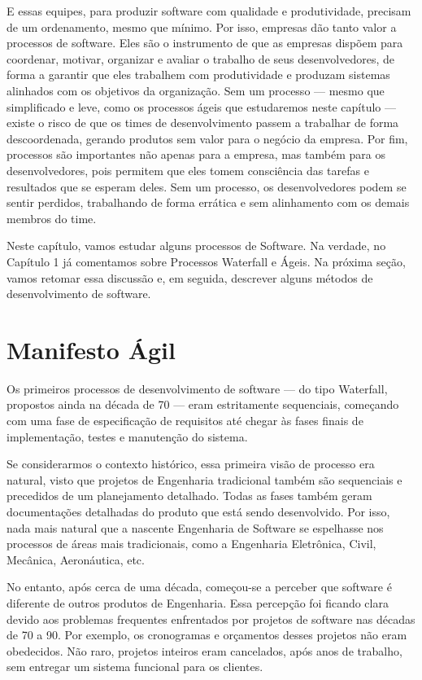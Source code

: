 \documentclass[
  11pt,
  twoside]{book}
\begin{document}
E essas equipes, para produzir software com qualidade e produtividade,
precisam de um ordenamento, mesmo que mínimo. Por isso, empresas dão
tanto valor a processos de software. Eles são o instrumento de que as
empresas dispõem para coordenar, motivar, organizar e avaliar o trabalho
de seus desenvolvedores, de forma a garantir que eles trabalhem com
produtividade e produzam sistemas alinhados com os objetivos da
organização. Sem um processo --- mesmo que simplificado e leve, como os
processos ágeis que estudaremos neste capítulo --- existe o risco de que
os times de desenvolvimento passem a trabalhar de forma descoordenada,
gerando produtos sem valor para o negócio da empresa. Por fim, processos
são importantes não apenas para a empresa, mas também para os
desenvolvedores, pois permitem que eles tomem consciência das tarefas e
resultados que se esperam deles. Sem um processo, os desenvolvedores
podem se sentir perdidos, trabalhando de forma errática e sem
alinhamento com os demais membros do time.

Neste capítulo, vamos estudar alguns processos de Software. Na verdade,
no Capítulo 1 já comentamos sobre Processos Waterfall e Ágeis. Na
próxima seção, vamos retomar essa discussão e, em seguida, descrever
alguns métodos de desenvolvimento de software.

\hypertarget{manifesto-uxe1gil}{%
\section{Manifesto Ágil}\label{manifesto-uxe1gil}}

 Os primeiros processos de desenvolvimento de
software --- do tipo Waterfall, propostos ainda na década de 70 --- eram
estritamente sequenciais, começando com uma fase de especificação de
requisitos até chegar às fases finais de implementação, testes e
manutenção do sistema.

Se considerarmos o contexto histórico, essa primeira visão de processo
era natural, visto que projetos de Engenharia tradicional também são
sequenciais e precedidos de um planejamento detalhado. Todas as fases
também geram documentações detalhadas do produto que está sendo
desenvolvido. Por isso, nada mais natural que a nascente Engenharia de
Software se espelhasse nos processos de áreas mais tradicionais, como a
Engenharia Eletrônica, Civil, Mecânica, Aeronáutica, etc.

No entanto, após cerca de uma década, começou-se a perceber que software
é diferente de outros produtos de Engenharia. Essa percepção foi ficando
clara devido aos problemas frequentes enfrentados por projetos de
software nas décadas de 70 a 90. Por exemplo, os cronogramas e
orçamentos desses projetos não eram obedecidos. Não raro, projetos
inteiros eram cancelados, após anos de trabalho, sem entregar um sistema
funcional para os clientes.
\end{document}
